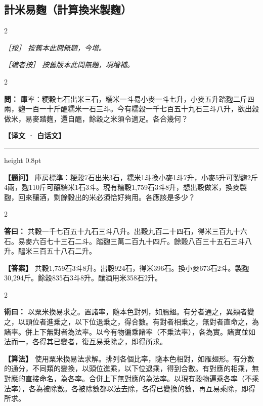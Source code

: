 \documentclass[11pt,a4paper]{article}
\newcommand{\ClassicalQuestion}[1]{\par\noindent\textbf{\color{problemcolor}問：}#1\par}
\newcommand{\ClassicalAnswer}[1]{\par\noindent\textbf{\color{answercolor}答曰：}#1\par}
\newcommand{\ClassicalMethod}[1]{\par\noindent\textbf{\color{methodcolor}術曰：}#1\par}
\newcommand{\ClassicalNote}[1]{\par\noindent\textit{［按］#1}\par}
\newcommand{\ModernQuestion}[1]{\par\noindent\textbf{\color{modernlabel}【题问】}#1\par}
\newcommand{\ModernAnswer}[1]{\par\noindent\textbf{\color{answercolor}【答案】}#1\par}
\newcommand{\ModernMethod}[1]{\par\noindent\textbf{\color{methodcolor}【算法】}#1\par}
\newcommand{\ModernNote}[1]{\par\noindent\textit{\color{notecolor}［编者按］#1}\par}
\newcommand{\ModernHeader}{%
  \begin{center}\textbf{\color{headermodern}【译文 · 白话文】}\end{center}
  \vspace{-0.5em}
  \hrule height 0.8pt
  \vspace{0.5em}
}
\begin{document}
\subsection*{\color{sectioncolor}計米易麴（計算換米製麴）}

\begin{paracol}{2}

\ClassicalNote{%
按舊本此問無題，今増。}

\switchcolumn

\ModernNote{%
按舊版本此問無題，現增補。
}

\end{paracol}

\begin{paracol}{2}

\ClassicalQuestion{%
庫率：粳榖七石出米三石，糯米一斗易小麥一斗七升，小麥五升踏麴二斤四兩，麴一百一十斤醞糯米一石三斗。今有糯穀一千七百五十九石三斗八升，欲出穀做米，易麥踏麴，還自醞，餘穀之米須令適足。各合幾何？}

\switchcolumn

\ModernHeader

\ModernQuestion{%
庫房標準：粳穀7石出米3石，糯米1斗換小麥1斗7升，小麥5升可製麴2斤4兩，麴110斤可釀糯米1石3斗。現有糯穀1,759石3斗8升，想出穀做米，換麥製麴，回來釀酒，剩餘穀出的米必須恰好夠用。各應該是多少？
}

\end{paracol}

\begin{paracol}{2}

\ClassicalAnswer{%
共穀一千七百五十九石三斗八升。出穀九百二十四石，得米三百九十六石。易麥六百七十三石二斗。踏麴三萬二百九十四斤。餘榖八百三十五石三斗八升。醞米三百五十八石二升。}

\switchcolumn

\ModernAnswer{%
共穀1,759石3斗8升。出穀924石，得米396石。換小麥673石2斗。製麴30,294斤。餘穀835石3斗8升。釀酒用米358石2升。
}

\end{paracol}

\begin{paracol}{2}

\ClassicalMethod{%
以粟米換易求之。置諸率，隨本色對列，如鴈翅。有分者通之，異類者變之，以頭位者進乗之，以下位退乗之，得合數。有對者相乗之，無對者直命之，為諸率。併上下無對者為法率。以今有物徧乘諸率（不乗法率），各為實。諸實並如法而一，各得其已變者，復互易乗除之，即得所求。}

\switchcolumn

\ModernMethod{%
使用粟米換易法求解。排列各個比率，隨本色相對，如雁翅形。有分數的通分，不同類的變換，以頭位進乘，以下位退乘，得到合數。有對應的相乘，無對應的直接命名，為各率。合併上下無對應的為法率。以現有穀物遍乘各率（不乘法率），各為被除數。各被除數都以法去除，各得已變換的數，再互易乘除，即得所求。
}

\end{paracol}
\end{document}
